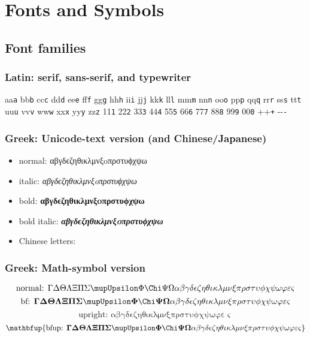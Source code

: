 \documentclass[11pt,pdfa]{MishoText}
\begin{document}
\chapter{Fonts and Symbols}

\section{Font families}
\subsection{Latin: serif, sans-serif, and typewriter}

\def\w#1{#1\textsf{#1}\texttt{#1} }
\w a\w b\w c\w d\w e\w f\w g\w h\w i\w j\w k\w l\w m\w n\w o\w p\w q\w r\w s\w t\w u\w v\w w\w x\w y\w z\w 1\w 2\w 3\w 4\w 5\w 6\w 7\w 8\w 9\w0 \w+\w-

\subsection{Greek: Unicode-text version (and Chinese/Japanese)}
\begin{itemize}
  \item normal: αβγδϵζηθικλμνξoπρστυϕχψω
  \item italic: \textit{αβγδϵζηθικλμνξoπρστυϕχψω}
  \item bold: \textbf{αβγδϵζηθικλμνξoπρστυϕχψω}
  \item bold italic: \textbf{\textit{αβγδϵζηθικλμνξoπρστυϕχψω}}
  \item Chinese letters: \endjapanese
\end{itemize}

\subsection{Greek: Math-symbol version}
\[
  \text{normal: }\Gamma \Delta \Theta \Lambda \Xi \Pi \Sigma \Upsilon \Phi \Chi \Psi \Omega
  \alpha \beta \gamma \delta \epsilon \zeta \eta \theta \iota \kappa \lambda \mu \nu \xi \pi \rho \sigma \tau \upsilon \phi \chi \psi \omega
  \varphi\varepsilon\varsigma
\]
\[\mathbf{
  \text{bf: }
  \Gamma \Delta \Theta \Lambda \Xi \Pi \Sigma \Upsilon \Phi \Chi \Psi \Omega
  \alpha \beta \gamma \delta \epsilon \zeta \eta \theta \iota \kappa \lambda \mu \nu \xi \pi \rho \sigma \tau \upsilon \phi \chi \psi \omega
  \varphi\varepsilon\varsigma
}\]
\[\mathup{
  \text{upright: }
  \alpha \beta \gamma \delta \epsilon \zeta \eta \theta \iota \kappa \lambda \mu \nu \xi \pi \rho \sigma \tau \upsilon \phi \chi \psi \omega
  \varphi\varepsilon\varsigma
}\]
\[\mathbf{\mathbfup{
  \text{bfup: }
  \Gamma \Delta \Theta \Lambda \Xi \Pi \Sigma \Upsilon \Phi \Chi \Psi \Omega
  \alpha \beta \gamma \delta \epsilon \zeta \eta \theta \iota \kappa \lambda \mu \nu \xi \pi \rho \sigma \tau \upsilon \phi \chi \psi \omega
  \varphi\varepsilon\varsigma
}}\]
\end{document}
